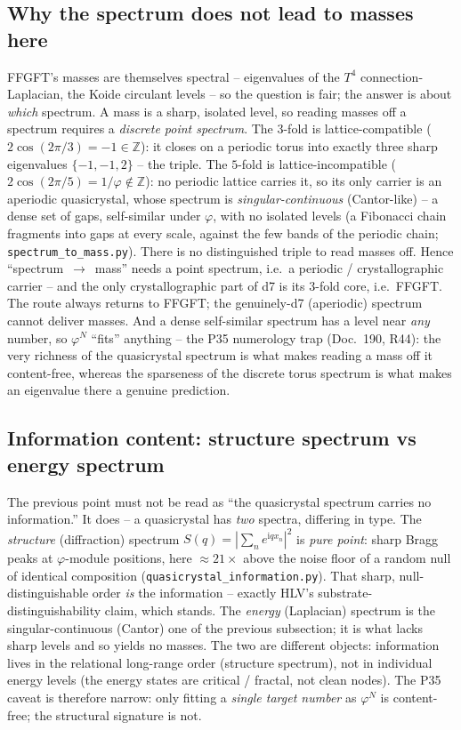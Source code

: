 \subsection{Why the spectrum does not lead to masses here}
FFGFT's masses are themselves spectral -- eigenvalues of the $T^4$ connection-Laplacian, the
Koide circulant levels -- so the question is fair; the answer is about \emph{which} spectrum.
A mass is a sharp, isolated level, so reading masses off a spectrum requires a \emph{discrete
point spectrum}. The $3$-fold is lattice-compatible ($2\cos(2\pi/3)=-1\in\mathbb{Z}$): it
closes on a periodic torus into exactly three sharp eigenvalues $\{-1,-1,2\}$ -- the triple.
The $5$-fold is lattice-incompatible ($2\cos(2\pi/5)=1/\varphi\notin\mathbb{Z}$): no periodic
lattice carries it, so its only carrier is an aperiodic quasicrystal, whose spectrum is
\emph{singular-continuous} (Cantor-like) -- a dense set of gaps, self-similar under $\varphi$,
with no isolated levels (a Fibonacci chain fragments into gaps at every scale, against the few
bands of the periodic chain; \texttt{spectrum\_to\_mass.py}). There is no distinguished triple
to read masses off. Hence \enquote{spectrum~$\to$~mass} needs a point spectrum, i.e.\ a
periodic / crystallographic carrier -- and the only crystallographic part of d7 is its
$3$-fold core, i.e.\ FFGFT. The route always returns to FFGFT; the genuinely-d7 (aperiodic)
spectrum cannot deliver masses. And a dense self-similar spectrum has a level near \emph{any}
number, so $\varphi^N$ \enquote{fits} anything -- the P35 numerology trap (Doc.~190, R44): the
very richness of the quasicrystal spectrum is what makes reading a mass off it content-free,
whereas the sparseness of the discrete torus spectrum is what makes an eigenvalue there a
genuine prediction.

\subsection{Information content: structure spectrum vs energy spectrum}
The previous point must not be read as \enquote{the quasicrystal spectrum carries no
information.} It does -- a quasicrystal has \emph{two} spectra, differing in type. The
\emph{structure} (diffraction) spectrum $S(q)=|\sum_n e^{\mathrm i q x_n}|^2$ is \emph{pure
point}: sharp Bragg peaks at $\varphi$-module positions, here $\approx21\times$ above the noise
floor of a random null of identical composition (\texttt{quasicrystal\_information.py}). That
sharp, null-distinguishable order \emph{is} the information -- exactly HLV's
substrate-distinguishability claim, which stands. The \emph{energy} (Laplacian) spectrum is the
singular-continuous (Cantor) one of the previous subsection; it is what lacks sharp levels and
so yields no masses. The two are different objects: information lives in the relational
long-range order (structure spectrum), not in individual energy levels (the energy states are
critical / fractal, not clean nodes). The P35 caveat is therefore narrow: only fitting a
\emph{single target number} as $\varphi^N$ is content-free; the structural signature is not.

